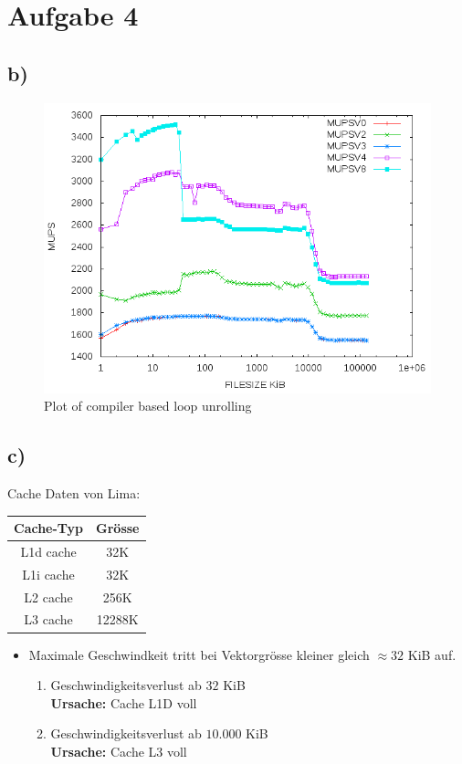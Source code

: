 \documentclass{article}
\begin{document}
\section*{Aufgabe 4}
\subsection*{b)}

\begin{center}
	\begin{figure}[h]
	\includegraphics[scale=0.6]{pics/a4b.png}
	\caption{Plot of compiler based loop unrolling}
	\end{figure}
\end{center}

\subsection*{c)}
Cache Daten von Lima:\\
\begin{center}
	\begin{tabular}{| c || c |}
		\hline
		Cache-Typ             & Gr\"osse \\
		\hline
		\hline
		L1d cache             &    32K\\
		\hline
		L1i cache             &    32K\\
		\hline
		L2 cache              &    256K\\
		\hline
		L3 cache              &    12288K\\
		\hline
	\end{tabular}
\end{center}

\begin{itemize}
	\item Maximale Geschwindkeit tritt bei Vektorgr\"osse kleiner gleich $\approx 32$ KiB auf.
		\begin{enumerate}
			\item Geschwindigkeitsverlust ab $32$ KiB\\ \textbf{Ursache:} Cache L1D voll
			\item Geschwindigkeitsverlust ab $10.000$ KiB\\ \textbf{Ursache:} Cache L3 voll
		\end{enumerate}
\end{itemize}
\end{document}
